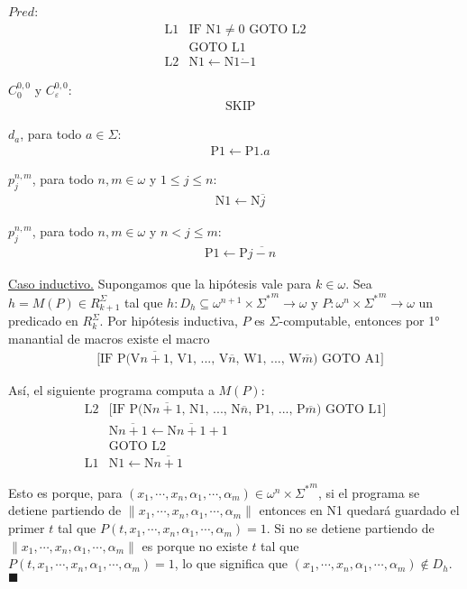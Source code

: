 \documentclass{article}
\begin{document}
\indent $Pred$:
\[
\begin{array}{ll}
\text{L1} & \text{IF N1} \neq 0 \text{ GOTO L2} \\
    & \text{GOTO L1} \\
\text{L2} & \text{N1} \leftarrow \text{N1} \dot{-} 1
\end{array}
\]

\indent $C^{0,0}_0$ y $C^{0,0}_{\varepsilon}$:
\[
\begin{array}{ll}
    & \text{SKIP}
\end{array}
\]

\indent $d_a$, para todo $a \in \Sigma$:
\[
\begin{array}{ll}
    & \text{P1} \leftarrow \text{P1}.a
\end{array}
\]

\indent $p^{n,m}_j$, para todo $n,m \in \omega$ y $1 \leq j \leq n$:
\[
\begin{array}{ll}
    & \text{N1} \leftarrow \text{N}\overline{j}
\end{array}
\]

\indent $p^{n,m}_j$, para todo $n,m \in \omega$ y $n < j \leq m$:
\[
\begin{array}{ll}
    & \text{P1} \leftarrow \text{P}\overline{j - n}
\end{array}
\]
\vspace{2em}


\underline{Caso inductivo.} Supongamos que la hipótesis vale para $k \in \omega$. Sea $h = M(P) \in R^{\Sigma}_{k+1}$ tal que $h: D_h \subseteq \omega^{n+1} \times {\Sigma^{*}}^{m} \rightarrow \omega$ y $P: \omega^{n} \times {\Sigma^{*}}^{m} \rightarrow \omega$ un predicado en $R^{\Sigma}_k$. Por hipótesis inductiva, $P$ es $\Sigma$-computable, entonces por 1° manantial de macros existe el macro
\[
\begin{array}{ll}
    & \text{[IF P(V}\overline{n+1}\text{, V1, ..., V}\overline{n}\text{, W1, ..., W}\overline{m}\text{) GOTO A1]}
\end{array}
\]

Así, el siguiente programa computa a $M(P)$:
\[
\begin{array}{ll}
\text{L2} & \text{[IF P(N}\overline{n+1}\text{, N1, ..., N}\overline{n}\text{, P1, ..., P}\overline{m}\text{) GOTO L1]} \\
    & \text{N}\overline{n+1} \leftarrow \text{N}\overline{n+1} + 1 \\
    & \text{GOTO L2} \\
\text{L1} & \text{N1} \leftarrow \text{N}\overline{n+1}
\end{array}
\]

Esto es porque, para $(x_1, \cdots, x_n, \alpha_1, \cdots, \alpha_m) \in \omega^n \times {\Sigma^*}^m$, si el programa se detiene partiendo de $\lVert x_1, \cdots, x_n, \alpha_1, \cdots, \alpha_m \rVert$ entonces en N1 quedará guardado el primer $t$ tal que $P(t, x_1, \cdots, x_n, \alpha_1, \cdots, \alpha_m) = 1$. Si no se detiene partiendo de $\lVert x_1, \cdots, x_n, \alpha_1, \cdots, \alpha_m \rVert$ es porque no existe $t$ tal que $P(t, x_1, \cdots, x_n, \alpha_1, \cdots, \alpha_m) = 1$, lo que significa que $(x_1, \cdots, x_n, \alpha_1, \cdots, \alpha_m) \notin D_h$.
\hfill $\blacksquare$
\end{document}
